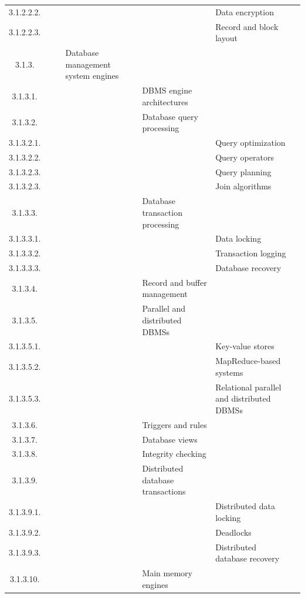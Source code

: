 \documentclass[12pt]{article}
\begin{document}
\begin{center}
{\begin{tabularx}{\linewidth}{|c|X|X|X|X|X|X|}
		3.1.2.2.2. &   &   &   &   &  Data encryption &   \\
		3.1.2.2.3. &   &   &   &   &  Record and block layout &   \\
		3.1.3. &   &   &  Database management system engines &   &   &   \\
		3.1.3.1. &   &   &   &  DBMS engine architectures &   &   \\
		3.1.3.2. &   &   &   &  Database query processing &   &   \\
		3.1.3.2.1. &   &   &   &   &  Query optimization &   \\
		3.1.3.2.2. &   &   &   &   &  Query operators &   \\
		3.1.3.2.3. &   &   &   &   &  Query planning &   \\
		3.1.3.2.3. &   &   &   &   &  Join algorithms &   \\
		3.1.3.3. &   &   &   &  Database transaction processing &   &   \\
		3.1.3.3.1. &   &   &   &   &  Data locking &   \\
		3.1.3.3.2. &   &   &   &   &  Transaction logging &   \\
		3.1.3.3.3. &   &   &   &   &  Database recovery &   \\
		3.1.3.4. &   &   &   &  Record and buffer management &   &   \\
		3.1.3.5. &   &   &   &  Parallel and distributed DBMSs &   &   \\
		3.1.3.5.1. &   &   &   &   &  Key-value stores &   \\
		3.1.3.5.2. &   &   &   &   &  MapReduce-based systems &   \\
		3.1.3.5.3. &   &   &   &   &  Relational parallel and distributed DBMSs &   \\
		3.1.3.6. &   &   &   &  Triggers and rules &   &   \\
		3.1.3.7. &   &   &   &  Database views &   &   \\
		3.1.3.8. &   &   &   &  Integrity checking &   &   \\
		3.1.3.9. &   &   &   &  Distributed database transactions &   &   \\
		3.1.3.9.1. &   &   &   &   &  Distributed data locking &   \\
		3.1.3.9.2. &   &   &   &   &  Deadlocks &   \\
		3.1.3.9.3. &   &   &   &   &  Distributed database recovery &   \\
		3.1.3.10. &   &   &   &  Main memory engines &   &   \\

\end{tabularx}}
\end{center}
\end{document}

